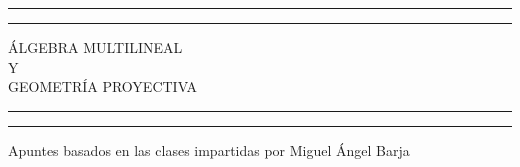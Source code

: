 \newcommand{\plogo}{\fbox{$\mathcal{PL}$}} %

\begin{titlepage} %

    \centering %

    \scshape %

    \vspace*{5\baselineskip} %


    \rule{\textwidth}{1.6pt}\vspace*{-\baselineskip}\vspace*{2pt} %
    \rule{\textwidth}{0.4pt} %

    \vspace{0.75\baselineskip} %

    {\LARGE ÁLGEBRA MULTILINEAL\\ Y\\ GEOMETRÍA PROYECTIVA\\} %

    \vspace{0.75\baselineskip} %

    \rule{\textwidth}{0.4pt}\vspace*{-\baselineskip}\vspace{3.2pt} %
    \rule{\textwidth}{1.6pt} %

    \vspace{1.5\baselineskip} %


    Apuntes basados en las clases impartidas por Miguel Ángel Barja

    \vspace*{1\baselineskip} %





\end{titlepage}

